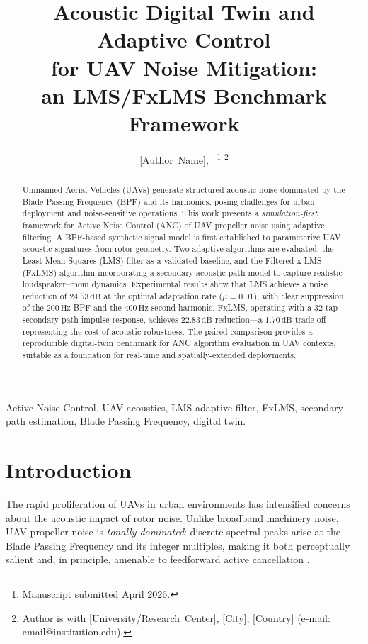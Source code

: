 \documentclass[journal,12pt,onecolumn]{IEEEtran}
\title{Acoustic Digital Twin and Adaptive Control\\
       for UAV Noise Mitigation:\\
       an LMS/FxLMS Benchmark Framework}
\author{[Author~Name],~\IEEEmembership{Student~Member,~IEEE}%
  \thanks{Manuscript submitted April 2026.}%
  \thanks{Author is with [University/Research~Center], [City], [Country]
          (e-mail: email@institution.edu).}}
\newcommand{\SI}[2]{\ensuremath{#1\,\mathrm{#2}}}
\begin{document}
\maketitle

\begin{abstract}
Unmanned Aerial Vehicles (UAVs) generate structured acoustic noise dominated
by the Blade Passing Frequency (BPF) and its harmonics, posing challenges
for urban deployment and noise-sensitive operations.
This work presents a \emph{simulation-first} framework for Active Noise
Control (ANC) of UAV propeller noise using adaptive filtering.
A BPF-based synthetic signal model is first established to parameterize
UAV acoustic signatures from rotor geometry.
Two adaptive algorithms are evaluated: the Least Mean Squares (LMS) filter
as a validated baseline, and the Filtered-x LMS (FxLMS) algorithm
incorporating a secondary acoustic path model to capture realistic
loudspeaker--room dynamics.
Experimental results show that LMS achieves a noise reduction of
\SI{24.53}{dB} at the optimal adaptation rate ($\mu = 0.01$), with clear
suppression of the \SI{200}{Hz} BPF and the \SI{400}{Hz} second harmonic.
FxLMS, operating with a 32-tap secondary-path impulse response, achieves
\SI{22.83}{dB} reduction—a \SI{1.70}{dB} trade-off representing the cost
of acoustic robustness.
The paired comparison provides a reproducible digital-twin benchmark for
ANC algorithm evaluation in UAV contexts, suitable as a foundation for
real-time and spatially-extended deployments.
\end{abstract}

\begin{IEEEkeywords}
Active Noise Control, UAV acoustics, LMS adaptive filter, FxLMS,
secondary path estimation, Blade Passing Frequency, digital twin.
\end{IEEEkeywords}

\section{Introduction}
\label{sec:intro}

The rapid proliferation of UAVs in urban environments has intensified
concerns about the acoustic impact of rotor noise.
Unlike broadband machinery noise, UAV propeller noise is
\emph{tonally dominated}: discrete spectral peaks arise at the Blade
Passing Frequency and its integer multiples, making it both perceptually
salient and, in principle, amenable to feedforward active cancellation
\cite{kuo1996,nelson1992}.
\end{document}
